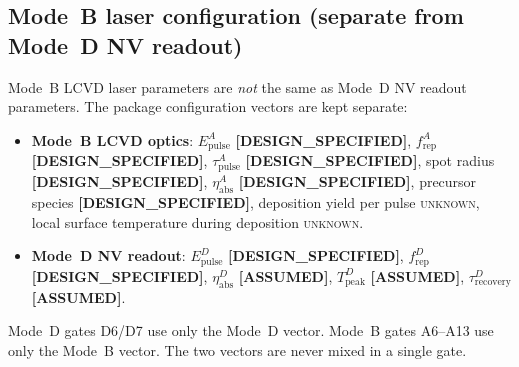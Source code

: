 \documentclass[12pt,a4paper]{article}
\newcommand{\unknown}{\textsc{unknown}}
\newcommand{\assumed}{\textbf{[ASSUMED]}}
\newcommand{\designspec}{\textbf{[DESIGN\_SPECIFIED]}}
\begin{document}
\subsection*{Mode~B laser configuration (separate from Mode~D NV readout)}
Mode~B LCVD laser parameters are \emph{not} the same as Mode~D NV readout
parameters. The package configuration vectors are kept separate:
\begin{itemize}[noitemsep]
  \item \textbf{Mode~B LCVD optics}: $E_{\mathrm{pulse}}^A$ \designspec{},
        $f_{\mathrm{rep}}^A$ \designspec{}, $\tau_{\mathrm{pulse}}^A$ \designspec{},
        spot radius \designspec{}, $\eta_{\mathrm{abs}}^A$ \designspec{},
        precursor species \designspec{},
        deposition yield per pulse \unknown{},
        local surface temperature during deposition \unknown{}.
  \item \textbf{Mode~D NV readout}: $E_{\mathrm{pulse}}^D$ \designspec{},
        $f_{\mathrm{rep}}^D$ \designspec{}, $\eta_{\mathrm{abs}}^D$ \assumed{},
        $T_{\mathrm{peak}}^D$ \assumed{}, $\tau_{\mathrm{recovery}}^D$ \assumed{}.
\end{itemize}
Mode~D gates D6/D7 use only the Mode~D vector. Mode~B gates A6--A13 use only
the Mode~B vector. The two vectors are never mixed in a single gate.
\end{document}
